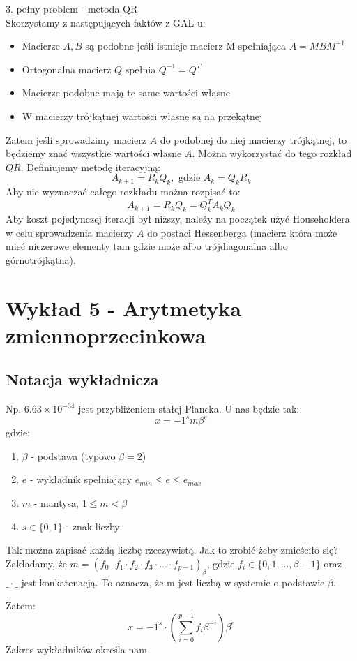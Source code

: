 \documentclass{article}
\begin{document}
3. pełny problem - metoda QR \\
Skorzystamy z następujących faktów z GAL-u:
\begin{itemize}
	\item Macierze $ A, B $ są podobne jeśli istnieje macierz M spełniająca $ A=MBM^{-1} $
	\item Ortogonalna macierz $ Q $ spełnia $ Q^{-1}=Q^T $
	\item Macierze podobne mają te same wartości własne
	\item W macierzy trójkątnej wartości własne są na przekątnej
\end{itemize}
Zatem jeśli sprowadzimy macierz $A$ do podobnej do niej macierzy trójkątnej, to będziemy znać wszystkie wartości własne $A$. Można wykorzystać do tego rozkład $QR$. Definiujemy metodę iteracyjną:
$$A_{k+1}=R_kQ_k, \text{ gdzie } A_k=Q_kR_k$$
Aby nie wyznaczać całego rozkładu można rozpisać to:
$$A_{k+1}=R_kQ_k=Q_k^TA_kQ_k$$
Aby koszt pojedynczej iteracji był niższy, należy na początek użyć Householdera w celu sprowadzenia macierzy $ A $ do postaci Hessenberga (macierz która może mieć niezerowe elementy tam gdzie może albo trójdiagonalna albo górnotrójkątna).
\section{Wykład 5 - Arytmetyka zmiennoprzecinkowa}
\subsection{Notacja wykładnicza}
Np. $6.63\times 10^{-34}$ jest przybliżeniem stałej Plancka.
U nas będzie tak:
$$x=-1^s m\beta^{e}$$
gdzie:
\begin{enumerate}
	\item $\beta$ - podstawa (typowo $ \beta =2$)
	\item $ e $ - wykładnik spełniający $ e_{min}\leq e\le e_{max} $
	\item $ m $ - mantysa, $ 1\le m < \beta $
	\item $ s\in\{0,1\} $ - znak liczby
\end{enumerate}
Tak można zapisać każdą liczbę rzeczywistą. Jak to zrobić żeby zmieściło się? Zakładamy, że $ m=(f_0\cdot f_1\cdot f_2\cdot f_3\cdot \ldots\cdot f_{p-1})_\beta $, gdzie $ f_i\in\{0,1,\ldots, \beta-1\} $ oraz $ \_\cdot\_ $ jest konkatenacją. To oznacza, że m jest liczbą w systemie o podstawie $ \beta $.

Zatem:
$$x=-1^s\cdot(\sum_{i=0}^{p-1}f_i\beta^{-i})\beta^e$$
Zakres wykładników określa nam 
\end{document}
